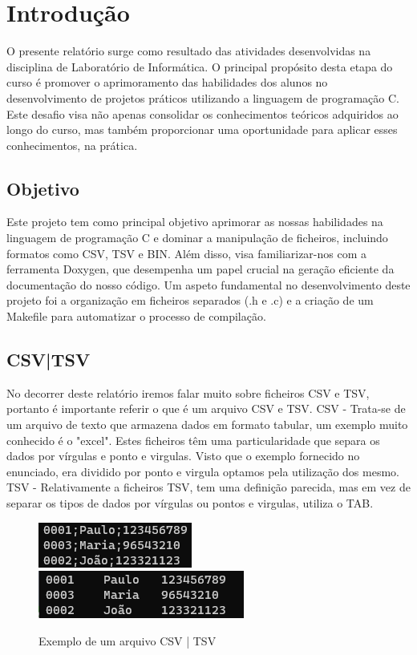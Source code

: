 \documentclass[a4wide]{report}
\begin{document}
\chapter{Introdução}
O presente relatório surge como resultado das atividades desenvolvidas na disciplina de Laboratório de Informática. O principal propósito desta etapa do curso é promover o aprimoramento das habilidades dos alunos no desenvolvimento de projetos práticos utilizando a linguagem de programação C. Este desafio visa não apenas consolidar os conhecimentos teóricos adquiridos ao longo do curso, mas também proporcionar uma oportunidade para aplicar esses conhecimentos, na prática.
\section{Objetivo }
Este projeto tem como principal objetivo aprimorar as nossas habilidades na linguagem de programação C e dominar a manipulação de ficheiros, incluindo formatos como CSV, TSV e BIN. Além disso, visa familiarizar-nos com a ferramenta Doxygen, que desempenha um papel crucial na geração eficiente da documentação do nosso código. Um aspeto fundamental no desenvolvimento deste projeto foi a organização em ficheiros separados (.h e .c) e a criação de um Makefile para automatizar o processo de compilação.
\section{CSV|TSV }
No decorrer deste relatório iremos falar muito sobre ficheiros CSV e TSV, portanto é importante referir o que é um arquivo CSV e TSV. 
CSV - Trata-se de um arquivo de texto que armazena dados em formato tabular, um exemplo muito conhecido é o "excel". Estes ficheiros têm uma particularidade que separa os dados por vírgulas e ponto e virgulas. Visto que o exemplo fornecido no enunciado, era dividido por ponto e virgula optamos pela utilização dos mesmo. 
TSV - Relativamente a ficheiros TSV, tem uma definição parecida, mas em vez de separar os tipos de dados por vírgulas ou pontos e virgulas, utiliza o TAB.
\begin{figure}[h]
\centering
\vspace{0.5cm}
\includegraphics[width=0.3\linewidth]{csv.png}
\hspace{1cm}
\includegraphics[width=0.3\linewidth]{tsv.png}
\vspace{0.5cm}
\caption{Exemplo de um arquivo CSV | TSV}
\label{fig:csv-label}
\label{fig:tsv-label}
\end{figure}
\end{document}
